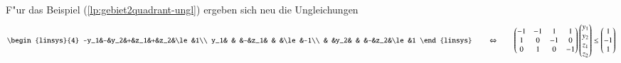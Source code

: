 \begin{beispiel}
F"ur das Beispiel (\ref{lp:gebiet2quadrant-ungl}) ergeben sich neu die 
Ungleichungen
\begin{equation}
\begin{linsys}{4}
-y_1&-&y_2&+&z_1&+&z_2&\le&1\\
 y_1& &   &-&z_1& &   &\le&-1\\
    & &y_2& &   &-&z_2&\le&1
\end{linsys}
\qquad
\Leftrightarrow
\qquad
\begin{pmatrix}
-1&-1&1&1\\
1&0&-1&0\\
0&1&0&-1
\end{pmatrix}
\begin{pmatrix}y_1\\y_2\\z_1\\z_2\end{pmatrix}
\le 
\begin{pmatrix}1\\-1\\1\end{pmatrix}
\notag
\end{equation}
\end{beispiel}

